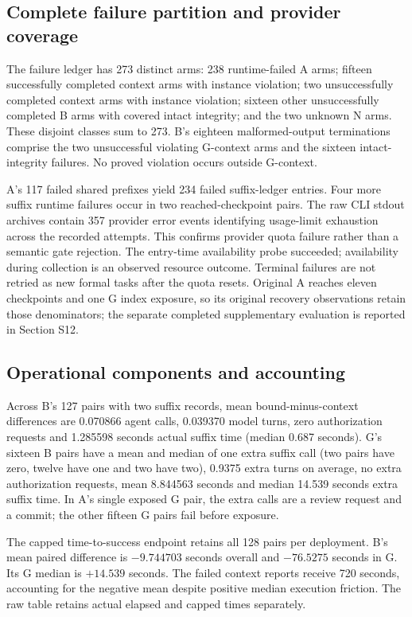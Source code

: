 \documentclass[11pt,a4paper]{article}
\begin{document}
\subsection{Complete failure partition and provider coverage}
The failure ledger has 273 distinct arms: 238 runtime-failed A arms; fifteen successfully completed context arms with instance violation; two unsuccessfully completed context arms with instance violation; sixteen other unsuccessfully completed B arms with covered intact integrity; and the two unknown N arms. These disjoint classes sum to 273. B's eighteen malformed-output terminations comprise the two unsuccessful violating G-context arms and the sixteen intact-integrity failures. No proved violation occurs outside G-context.

A's 117 failed shared prefixes yield 234 failed suffix-ledger entries. Four more suffix runtime failures occur in two reached-checkpoint pairs. The raw CLI stdout archives contain 357 provider error events identifying usage-limit exhaustion across the recorded attempts. This confirms provider quota failure rather than a semantic gate rejection. The entry-time availability probe succeeded; availability during collection is an observed resource outcome. Terminal failures are not retried as new formal tasks after the quota resets. Original A reaches eleven checkpoints and one G index exposure, so its original recovery observations retain those denominators; the separate completed supplementary evaluation is reported in Section S12.

\subsection{Operational components and accounting}
Across B's 127 pairs with two suffix records, mean bound-minus-context differences are 0.070866 agent calls, 0.039370 model turns, zero authorization requests and 1.285598 seconds actual suffix time (median 0.687 seconds). G's sixteen B pairs have a mean and median of one extra suffix call (two pairs have zero, twelve have one and two have two), 0.9375 extra turns on average, no extra authorization requests, mean 8.844563 seconds and median 14.539 seconds extra suffix time. In A's single exposed G pair, the extra calls are a review request and a commit; the other fifteen G pairs fail before exposure.

The capped time-to-success endpoint retains all 128 pairs per deployment. B's mean paired difference is $-9.744703$ seconds overall and $-76.5275$ seconds in G. Its G median is $+14.539$ seconds. The failed context reports receive 720 seconds, accounting for the negative mean despite positive median execution friction. The raw table retains actual elapsed and capped times separately.
\end{document}

